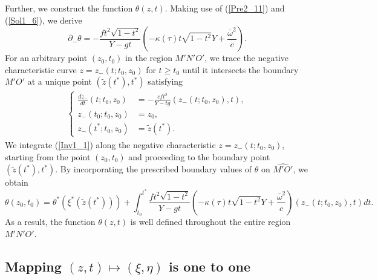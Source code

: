 \documentclass[3p,11pt]{elsarticle}
\numberwithin{equation}{section}
\begin{document}
Further, we construct the function $\theta(z,t)$. Making use of (\ref{Pre2_11}) and (\ref{Sol1_6}), we derive
\begin{equation}\label{Inv1_1}
    \partial_-\theta = -\frac{ft^2\sqrt{1-t^2}}{ Y-gt}\left(-\kappa(\tau)t\sqrt{1-t^2} Y
        +\frac{\bar\omega^2}{c}\right).
\end{equation}
For an arbitrary point $(z_0,t_0)$ in the region $M'N'O'$, we trace the negative characteristic curve $z=z_{-}(t; t_0, z_0)$ for $t\ge t_0$ until it intersects the boundary $M'O'$ at a unique point $(\tilde z(t^{\ast}), t^{\ast})$ satisfying
\begin{equation*}\label{Inv1_2}
    \begin{split}
        \begin{cases}
            \frac{dz_-}{dt}(t; t_0, z_0)&=-\frac{cft^2}{ Y-tg}(z_-(t; t_0, z_0),t),\\
            z_-(t_0; t_0, z_0)&=z_0,\\
            z_-(t^*; t_0, z_0)&=\tilde z(t^*).
        \end{cases}
    \end{split}
\end{equation*}
We integrate (\ref{Inv1_1}) along the negative characteristic $z=z_{-}(t; t_0, z_0)$, starting from the point $(z_0, t_0)$ and proceeding to the boundary point $(\tilde z(t^{\ast}), t^{\ast})$. By incorporating the prescribed boundary values of $\theta$ on $\widehat{M'O'}$, we obtain
\begin{equation*}\label{Inv1_3}
    \theta(z_0,t_0)=\theta^*(\xi^*(\tilde z(t^*)))+\int_{t_0}^{t^*}  \frac{ft^2\sqrt{1-t^2}}{ Y-gt}\left(-\kappa(\tau)t\sqrt{1-t^2} Y
        +\frac{\bar\omega^2}{c}\right)(z_{-}(t; t_0, z_0),t)dt.
\end{equation*}
As a result, the function $\theta(z,t)$ is well defined throughout the entire region $M'N'O'$. 

\subsection{Mapping $(z,t)\mapsto(\xi,\eta)$ is one to one}
\end{document}
